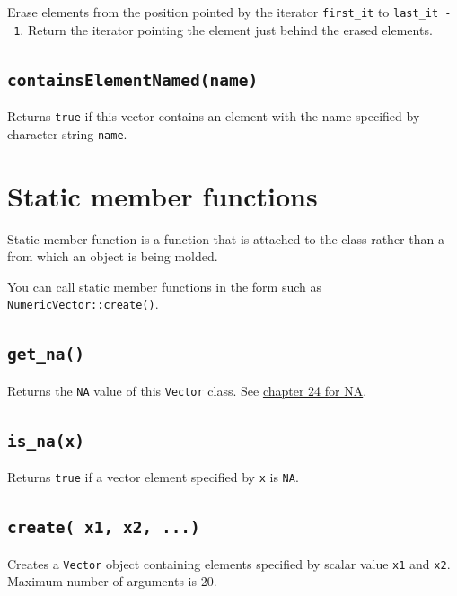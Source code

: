 \documentclass[
]{book}
\begin{document}
Erase elements from the position pointed by the iterator \texttt{first\_it} to \texttt{last\_it\ -\ 1}. Return the iterator pointing the element just behind the erased elements.

\hypertarget{containselementnamedname}{%
\subsection{\texorpdfstring{\texttt{containsElementNamed(name)}}{containsElementNamed(name)}}\label{containselementnamedname}}

Returns \texttt{true} if this vector contains an element with the name specified by character string \texttt{name}.

\hypertarget{static-member-functions}{%
\section{Static member functions}\label{static-member-functions}}

Static member function is a function that is attached to the class rather than a from which an object is being molded.

You can call static member functions in the form such as \texttt{NumericVector::create()}.

\hypertarget{get_na}{%
\subsection{\texorpdfstring{\texttt{get\_na()}}{get\_na()}}\label{get_na}}

Returns the \texttt{NA} value of this \texttt{Vector} class. See \href{240_na_nan_inf.html}{chapter 24 for NA}.

\hypertarget{is_nax}{%
\subsection{\texorpdfstring{\texttt{is\_na(x)}}{is\_na(x)}}\label{is_nax}}

Returns \texttt{true} if a vector element specified by \texttt{x} is \texttt{NA}.

\hypertarget{create-x1-x2-...}{%
\subsection{\texorpdfstring{\texttt{create(\ x1,\ x2,\ ...)}}{create( x1, x2, ...)}}\label{create-x1-x2-...}}

Creates a \texttt{Vector} object containing elements specified by scalar value \texttt{x1} and \texttt{x2}. Maximum number of arguments is 20.
\end{document}
